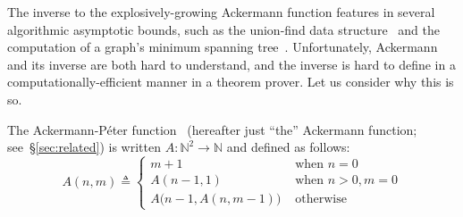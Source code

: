 The inverse to the explosively-growing Ackermann function
features in several algorithmic asymptotic
bounds, such as the union-find data structure~\cite{tarjan} and
the computation of a graph's minimum spanning
tree~\cite{chazelle}.  Unfortunately, Ackermann
and its inverse are both 
hard to understand, and the inverse is hard to define in a computationally-efficient manner in a theorem prover.  Let us consider why this
is so.
\begin{defn} \label{defn: ack}
The Ackermann-P\'eter function~\cite{peter} (hereafter just
``the'' Ackermann function; see~\S\ref{sec:related}) is
written $A : \mathbb{N}^2 \to \mathbb{N}$ and defined as follows:
\begin{equation}
\label{eq:ackermann}
A(n, m) \triangleq \begin{cases}
m + 1 & \text{ when } n = 0 \\
A(n-1, 1) & \text{ when } n > 0, m = 0 \\
A\big(n-1, A(n, m-1)\big) & \text{ otherwise}
\end{cases}
\end{equation} 
\end{defn}
